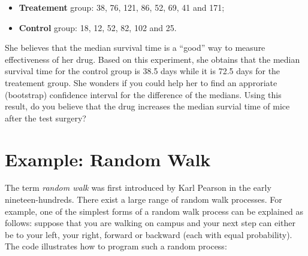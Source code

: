 \documentclass[12pt,]{krantz}
\providecommand{\tightlist}{%
  \setlength{\itemsep}{0pt}\setlength{\parskip}{0pt}}
\begin{document}
\begin{itemize}
\tightlist
\item
  \textbf{Treatement} group: 38, 76, 121, 86, 52, 69, 41 and 171;
\item
  \textbf{Control} group: 18, 12, 52, 82, 102 and 25.
\end{itemize}

She believes that the median survival time is a ``good'' way to measure
effectiveness of her drug. Based on this experiment, she obtains that
the median survival time for the control group is 38.5 days while it is
72.5 days for the treatement group. She wonders if you could help her to
find an approriate (bootstrap) confidence interval for the difference of
the medians. Using this result, do you believe that the drug increases
the median survial time of mice after the test surgery?

\section{Example: Random Walk}\label{example-random-walk}

The term \emph{random walk} was first introduced by Karl Pearson in the
early nineteen-hundreds. There exist a large range of random walk
processes. For example, one of the simplest forms of a random walk
process can be explained as follows: suppose that you are walking on
campus and your next step can either be to your left, your right,
forward or backward (each with equal probability). The code illustrates
how to program such a random process:
\end{document}
